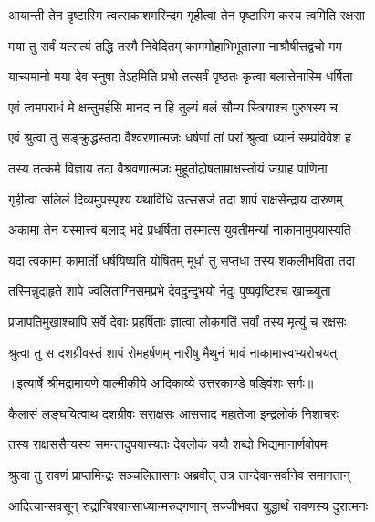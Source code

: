 \twolineshloka
{आयान्ती तेन दृष्टास्मि त्वत्सकाशमरिन्दम}
{गृहीत्वा तेन पृष्टास्मि कस्य त्वमिति रक्षसा} %

\twolineshloka
{मया तु सर्वं यत्सत्यं तद्धि तस्मै निवेदितम्}
{काममोहाभिभूतात्मा नाश्रौषीत्तद्वचो मम} %

\twolineshloka
{याच्यमानो मया देव स्नुषा तेऽहमिति प्रभो}
{तत्सर्वं पृष्ठतः कृत्वा बलात्तेनास्मि धर्षिता} %

\twolineshloka
{एवं त्वमपराधं मे क्षन्तुमर्हसि मानद}
{न हि तुल्यं बलं सौम्य स्त्रियाश्च पुरुषस्य च} %

\twolineshloka
{एवं श्रुत्वा तु सङ्क्रुद्धस्तदा वैश्वरणात्मजः}
{धर्षणां तां परां श्रुत्वा ध्यानं सम्प्रविवेश ह} %

\twolineshloka
{तस्य तत्कर्म विज्ञाय तदा वैश्रवणात्मजः}
{मुहूर्ताद्रोषताम्राक्षस्तोयं जग्राह पाणिना} %

\twolineshloka
{गृहीत्वा सलिलं दिव्यमुपस्पृश्य यथाविधि}
{उत्ससर्ज तदा शापं राक्षसेन्द्राय दारुणम्} %

\twolineshloka
{अकामा तेन यस्मात्त्वं बलाद् भद्रे प्रधर्षिता}
{तस्मात्स युवतीमन्यां नाकामामुपयास्यति} %

\twolineshloka
{यदा त्वकामां कामार्तो धर्षयिष्यति योषितम्}
{मूर्धा तु सप्तधा तस्य शकलीभविता तदा} %

\twolineshloka
{तस्मिन्नुदाहृते शापे ज्वलिताग्निसमप्रभे}
{देवदुन्दुभयो नेदुः पुष्पवृष्टिश्च खाच्च्युता} %

\twolineshloka
{प्रजापतिमुखाश्चापि सर्वे देवाः प्रहर्षिताः}
{ज्ञात्वा लोकगतिं सर्वां तस्य मृत्युं च रक्षसः} %

\twolineshloka
{श्रुत्वा तु स दशग्रीवस्तं शापं रोमहर्षणम्}
{नारीषु मैथुनं भावं नाकामास्वभ्यरोचयत्} %


{॥इत्यार्षे श्रीमद्रामायणे वाल्मीकीये आदिकाव्ये उत्तरकाण्डे षड्विंशः सर्गः॥}


\twolineshloka
{कैलासं लङ्घयित्वाथ दशग्रीवः सराक्षसः}
{आससाद महातेजा इन्द्रलोकं निशाचरः} %

\twolineshloka
{तस्य राक्षससैन्यस्य समन्तादुपयास्यतः}
{देवलोकं ययौ शब्दो भिद्यमानार्णवोपमः} %

\twolineshloka
{श्रुत्वा तु रावणं प्राप्तमिन्द्रः सञ्चलितासनः}
{अब्रवीत् तत्र तान्देवान्सर्वानेव समागतान्} %

\twolineshloka
{आदित्यान्सवसून् रुद्रान्विश्वान्साध्यान्मरुद्गणान्}
{सज्जीभवत युद्धार्थं रावणस्य दुरात्मनः} %

